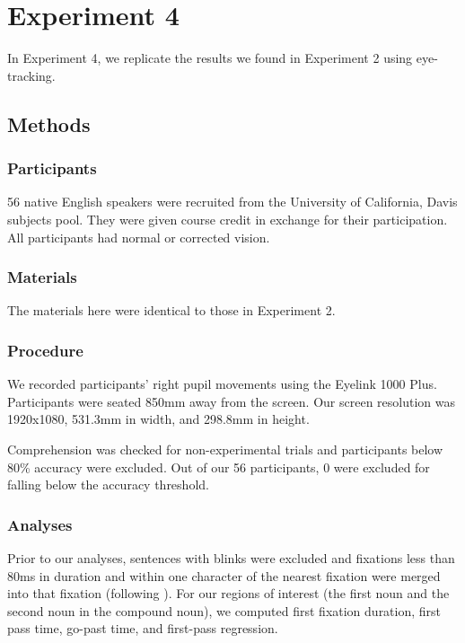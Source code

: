 \documentclass[
  12pt,
  letterpaper,
]{scrreprt}
\begin{document}
\section{Experiment 4}\label{experiment-4}

In Experiment 4, we replicate the results we found in Experiment 2 using
eye-tracking.

\subsection{Methods}\label{methods-3}

\subsubsection{Participants}\label{participants-3}

56 native English speakers were recruited from the University of
California, Davis subjects pool. They were given course credit in
exchange for their participation. All participants had normal or
corrected vision.

\subsubsection{Materials}\label{materials-1}

The materials here were identical to those in Experiment 2.

\subsubsection{Procedure}\label{procedure-2}

We recorded participants' right pupil movements using the Eyelink 1000
Plus. Participants were seated 850mm away from the screen. Our screen
resolution was 1920x1080, 531.3mm in width, and 298.8mm in height.

Comprehension was checked for non-experimental trials and participants
below 80\% accuracy were excluded. Out of our 56 participants, 0 were
excluded for falling below the accuracy threshold.

\subsubsection{Analyses}\label{analyses-1}

Prior to our analyses, sentences with blinks were excluded and fixations
less than 80ms in duration and within one character of the nearest
fixation were merged into that fixation (following
). For
our regions of interest (the first noun and the second noun in the
compound noun), we computed first fixation duration, first pass time,
go-past time, and first-pass regression.
\end{document}
